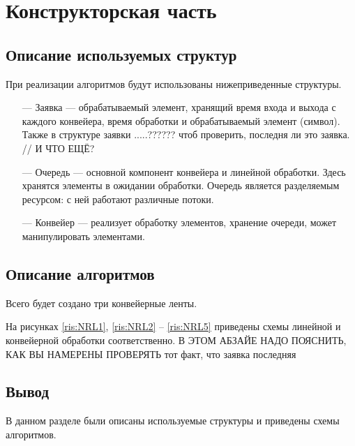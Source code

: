 \chapter{Конструкторская часть}

\section{Описание используемых структур}
При реализации алгоритмов будут использованы нижеприведенные структуры.
\begin{itemize}
	\item[---] Заявка --- обрабатываемый элемент, хранящий время входа и выхода с каждого конвейера, время обработки и обрабатываемый элемент (символ). Также в структуре заявки .....?????? чтоб проверить, последня ли это заявка. // И ЧТО ЕЩЁ?
	\item[---] Очередь ---  основной компонент конвейера и линейной обработки. Здесь хранятся элементы в ожидании обработки. Очередь является разделяемым ресурсом: с ней работают различные потоки.
	\item[---] Конвейер ---  реализует обработку элементов, хранение очереди, может манипулировать элементами.
\end{itemize} 

\section{Описание алгоритмов}
Всего будет создано три конвейерные ленты.

На рисунках \ref{ris:NRL1}, \ref{ris:NRL2} -- \ref{ris:NRL5} приведены схемы линейной и конвейерной обработки соответственно. В ЭТОМ АБЗАЙЕ НАДО ПОЯСНИТЬ, КАК ВЫ НАМЕРЕНЫ ПРОВЕРЯТЬ тот факт, что заявка последняя
\begin{center}	
\newpage
	\centering
	\def\svgwidth{12cm}
	
	\label{ris:NRL1}
\end{center}
\begin{center}	
	\centering
	\def\svgwidth{5cm}
	
	\label{ris:NRL2}
\end{center}
\begin{center}	
	\newpage
	\centering
	\def\svgwidth{11cm}
	
	\label{ris:NRL3}
\end{center}
\begin{center}	
	\centering
	\def\svgwidth{11cm}
	
	\label{ris:NRL4}
\end{center}
\begin{center}	
	\newpage
	\centering
	\def\svgwidth{11cm}
	
	\label{ris:NRL5}
\end{center}

\section*{Вывод}
В данном разделе были описаны используемые структуры и приведены схемы алгоритмов.
